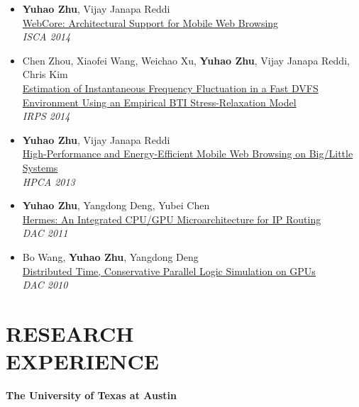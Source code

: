 \documentclass[margin, 9pt]{res} %
\begin{document}
\begin{resume}
\begin{itemize}[leftmargin=*]
	\item \textbf{Yuhao Zhu}, Vijay Janapa Reddi\\
          \href{http://yuhaozhu.com/pubs/isca14.pdf}{WebCore: Architectural Support for Mobile Web Browsing}\\
          \textit{ISCA 2014}

	\item Chen Zhou, Xiaofei Wang, Weichao Xu, \textbf{Yuhao Zhu}, Vijay Janapa Reddi, Chris Kim\\
          \href{http://yuhaozhu.com/pubs/irps14.pdf}{Estimation of Instantaneous Frequency Fluctuation in a Fast DVFS Environment Using an Empirical BTI Stress-Relaxation Model}\\
          \textit{IRPS 2014}

	\item \textbf{Yuhao Zhu}, Vijay Janapa Reddi\\
          \href{http://yuhaozhu.com/pubs/hpca13.pdf}{High-Performance and Energy-Efficient Mobile Web Browsing on Big/Little Systems}\\
          \textit{HPCA 2013}

	\item \textbf{Yuhao Zhu}, Yangdong Deng, Yubei Chen\\
          \href{http://yuhaozhu.com/pubs/dac11.pdf}{Hermes: An Integrated CPU/GPU Microarchitecture for IP Routing}\\
          \textit{DAC 2011}

	\item Bo Wang, \textbf{Yuhao Zhu}, Yangdong Deng\\
          \href{http://yuhaozhu.com/pubs/dac10.pdf}{Distributed Time, Conservative Parallel Logic Simulation on GPUs}\\
          \textit{DAC 2010}
\end{itemize}
 

\section{RESEARCH\\ EXPERIENCE}

{\large\textbf{The University of Texas at Austin}}\\


\end{resume}
\end{document}
